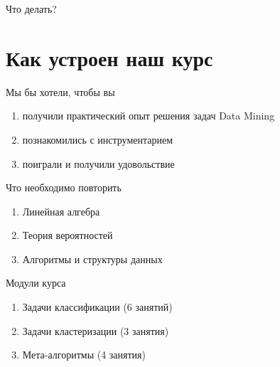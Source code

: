\documentclass[10pt,a4paper]{beamer}
\begin{document}
\begin{frame}{Что делать?}
\end{frame}


\section{Как устроен наш курс}

\begin{frame}{Мы бы хотели, чтобы вы}

\begin{enumerate}
\item получили практический опыт решения задач Data Mining
\item познакомились с инструментарием
\item поиграли и получили удовольствие
\end{enumerate}

\end{frame}


\begin{frame}{Что необходимо повторить}

\begin{enumerate}
\item Линейная алгебра
\item Теория вероятностей
\item Алгоритмы и структуры данных
\end{enumerate}

\end{frame}


\begin{frame}{Модули курса}

\begin{enumerate}
\item Задачи классификации (6 занятий)
\item Задачи кластеризации (3 занятия)
\item Мета-алгоритмы (4 занятия)
\end{enumerate}

\end{frame}

\end{document}
